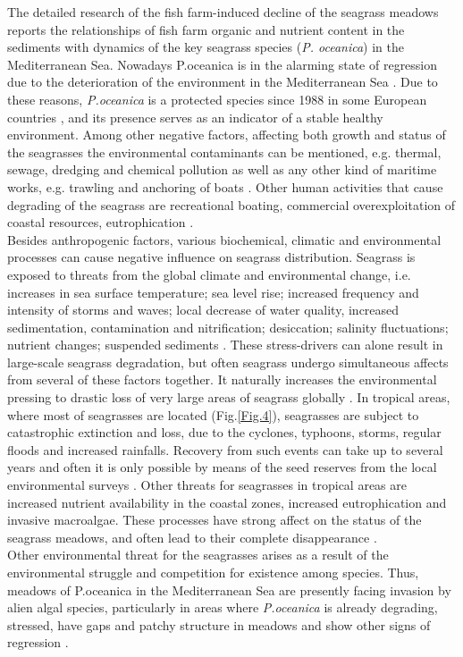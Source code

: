 \documentclass[10pt, a4paper]{article}
\begin{document}
The detailed research of the fish
farm-induced decline of the seagrass meadows \cite{Diaz-Almela06}\label{Diaz-Almela06}reports the relationships of
fish farm organic and nutrient content in the sediments with dynamics of the key seagrass species (\textit{P.
oceanica}) in the Mediterranean Sea. Nowadays P.oceanica is in the alarming state of regression due
to the deterioration of the environment in the Mediterranean Sea \cite{Ribed02}\label{Ribed02}. Due to these reasons,
\textit{P.oceanica} is a protected species since 1988 in some European countries \cite{Francour99}\label{Francour99}, and
its presence serves as an indicator of a stable healthy environment. Among other negative factors,
affecting both growth and status of the seagrasses the environmental contaminants can be mentioned,
e.g. thermal, sewage, dredging and chemical pollution as well as any other kind of maritime works,
e.g. trawling and anchoring of boats \cite{Ribed02}\label{Ribed02}. Other human activities that cause degrading of the
seagrass are recreational boating, commercial overexploitation of coastal resources, eutrophication
\cite{McKenzie06}\label{McKenzie06}.\\
Besides anthropogenic factors, various biochemical, climatic and environmental processes can cause
negative influence on seagrass distribution. Seagrass is exposed to threats from the global climate and
environmental change, i.e. increases in sea surface temperature; sea level rise; increased frequency
and intensity of storms and waves; local decrease of water quality, increased sedimentation,
contamination and nitrification; desiccation; salinity fluctuations; nutrient changes; suspended
sediments \cite{Blake00}\label{Blake00}. These stress-drivers can alone result in large-scale seagrass
degradation, but often seagrass undergo simultaneous affects from several of these factors together.
It naturally increases the environmental pressing  to drastic loss of very large areas of
seagrass globally \cite{Orth06}\label{Orth06}.
In tropical areas, where most of seagrasses are located (Fig.\ref{Fig.4}), seagrasses are subject to catastrophic
extinction and loss, due to the cyclones, typhoons, storms, regular floods and increased rainfalls. Recovery from such
events can take up to several years and often it is only possible by means of the seed reserves from the local
environmental surveys \cite{McKenzie07}\label{McKenzie07}. Other threats for seagrasses in tropical areas are 
increased nutrient availability in the coastal zones, increased
eutrophication and invasive macroalgae. These processes have strong affect on the status of the
seagrass meadows, and often lead to their complete disappearance \cite{Holmer09}\label{Holmer09}.\\
Other environmental threat for the seagrasses arises as a result of the environmental struggle and
competition for existence among species. Thus, meadows of P.oceanica in the Mediterranean Sea are
presently facing invasion by alien algal species, particularly in areas where \textit{P.oceanica} is already
degrading, stressed, have gaps and patchy structure in meadows and show other signs of regression
\cite{Montefalcone10}\label{Montefalcone10}.
\end{document}
